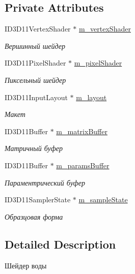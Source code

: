 \subsection*{Private Attributes}
\begin{DoxyCompactItemize}
\item 
I\+D3\+D11\+Vertex\+Shader $\ast$ \hyperlink{class_water_shader_class_ae19ada2749dd674be5042363baa12050}{m\+\_\+vertex\+Shader}
\begin{DoxyCompactList}\small\item\em Вершинный шейдер \end{DoxyCompactList}\item 
I\+D3\+D11\+Pixel\+Shader $\ast$ \hyperlink{class_water_shader_class_a16c57ccae08dfbb816cc5f5c5e46fe57}{m\+\_\+pixel\+Shader}
\begin{DoxyCompactList}\small\item\em Пиксельный шейдер \end{DoxyCompactList}\item 
I\+D3\+D11\+Input\+Layout $\ast$ \hyperlink{class_water_shader_class_a181cdd73327510090d23562e31b48ca9}{m\+\_\+layout}
\begin{DoxyCompactList}\small\item\em Макет \end{DoxyCompactList}\item 
I\+D3\+D11\+Buffer $\ast$ \hyperlink{class_water_shader_class_a14347c8007562907bfc126a46cfd8150}{m\+\_\+matrix\+Buffer}
\begin{DoxyCompactList}\small\item\em Матричный буфер \end{DoxyCompactList}\item 
I\+D3\+D11\+Buffer $\ast$ \hyperlink{class_water_shader_class_a657999745f03e0b27834ccc9373149f0}{m\+\_\+params\+Buffer}
\begin{DoxyCompactList}\small\item\em Параментрический буфер \end{DoxyCompactList}\item 
I\+D3\+D11\+Sampler\+State $\ast$ \hyperlink{class_water_shader_class_a54ef352dae939e2ca34d1925eca1aa34}{m\+\_\+sample\+State}
\begin{DoxyCompactList}\small\item\em Образцовая форма \end{DoxyCompactList}\end{DoxyCompactItemize}


\subsection{Detailed Description}
Шейдер воды 

